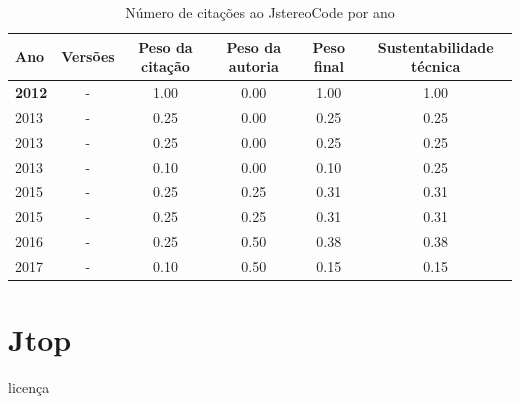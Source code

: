 \begin{table}[H]
\caption{Número de citações ao JstereoCode por ano}
\centering
\begin{tabular}{| l | c | c | c | c | c |}
  \hline
  Ano & Versões & Peso da citação & Peso da autoria & Peso final & Sustentabilidade técnica \\
  \hline
            {\bf 2012}
          &
          -
          &
          1.00
          &
          0.00
          &
          1.00
          &
            {\color{blue} 1.00}
          \\
\hline
            2013
          &
          -
          &
          0.25
          &
          0.00
          &
          0.25
          &
            {\color{red} 0.25}
          \\
            2013
          &
          -
          &
          0.25
          &
          0.00
          &
          0.25
          &
            {\color{red} 0.25}
          \\
            2013
          &
          -
          &
          0.10
          &
          0.00
          &
          0.10
          &
            {\color{red} 0.25}
          \\
\hline
            2015
          &
          -
          &
          0.25
          &
          0.25
          &
          0.31
          &
            {\color{red} 0.31}
          \\
            2015
          &
          -
          &
          0.25
          &
          0.25
          &
          0.31
          &
            {\color{red} 0.31}
          \\
\hline
            2016
          &
          -
          &
          0.25
          &
          0.50
          &
          0.38
          &
            {\color{red} 0.38}
          \\
\hline
            2017
          &
          -
          &
          0.10
          &
          0.50
          &
          0.15
          &
            {\color{red} 0.15}
          \\
\hline
\end{tabular}
\end{table}



\section{Jtop}
\checkmark licença


